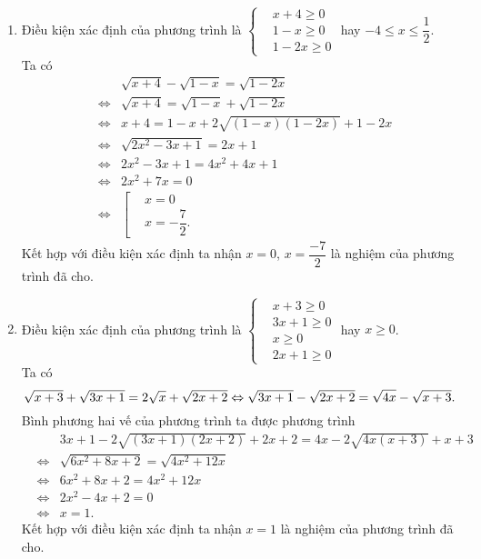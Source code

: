 \begin{vd}
{\begin{enumerate}
\begin{eqnarray*}
			\end{eqnarray*}
			Vậy phương trình đã cho có nghiệm duy nhất $x=2$.
			\item Điều kiện xác định của phương trình là $\left\{\begin{aligned}&x+4\geq 0 \\&1-x\geq 0 \\&1-2x\geq 0 \end{aligned}\right.$ hay $-4\leq x \leq \dfrac{1}{2}$.\\
			Ta có
			\allowdisplaybreaks
			\begin{eqnarray*}
				&& \sqrt{x+4}-\sqrt{1-x}=\sqrt{1-2x} \\
				&\Leftrightarrow & \sqrt{x+4}=\sqrt{1-x}+\sqrt{1-2x}\\
				&\Leftrightarrow & x+4=1-x+2\sqrt{(1-x)(1-2x)}+1-2x\\
				&\Leftrightarrow & \sqrt{2x^2-3x+1}=2x+1\\
				&\Leftrightarrow & 2x^2-3x+1=4x^2+4x+1\\
				&\Leftrightarrow & 2x^2+7x=0\\
				&\Leftrightarrow & \left[\begin{aligned}&x=0 \\&x=-\dfrac{7}{2}.\end{aligned}\right.
			\end{eqnarray*}
			Kết hợp với điều kiện xác định ta nhận $x=0$, $x=\dfrac{-7}{2}$ là nghiệm của phương trình đã cho.
			\item Điều kiện xác định của phương trình là $\left\{\begin{aligned}&x+3\geq 0 \\&3x+1\geq 0 \\&x\geq 0 \\&2x+1 \geq 0 \end{aligned}\right.$ hay $x\geq 0$.\\
			Ta có
			\allowdisplaybreaks
			\begin{equation}\label{9D4-4.1}
			\sqrt{x+3}+\sqrt{3x+1}=2\sqrt{x}+\sqrt{2x+2}  \Leftrightarrow  \sqrt{3x+1}-\sqrt{2x+2}=\sqrt{4x}-\sqrt{x+3}.\notag
			\end{equation}
			Bình phương hai vế của phương trình ta được phương trình
			\allowdisplaybreaks
			\begin{eqnarray*}
				&& 3x+1-2\sqrt{(3x+1)(2x+2)}+2x+2 = 4x-2\sqrt{4x(x+3)}+x+3\\
				&\Leftrightarrow & \sqrt{6x^2+8x+2}=\sqrt{4x^2+12x}\\
				&\Leftrightarrow & 6x^2+8x+2=4x^2+12x\\
				&\Leftrightarrow & 2x^2-4x+2=0\\
				&\Leftrightarrow & x=1.
			\end{eqnarray*}
			Kết hợp với điều kiện xác định ta nhận $x=1$ là nghiệm của phương trình đã cho.
		\end{enumerate}
	}
\end{vd}


